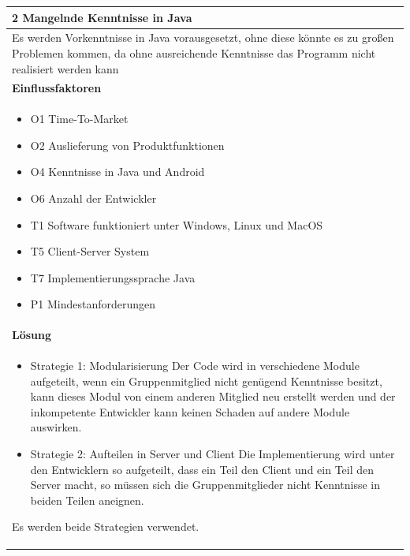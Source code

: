 \documentclass[fontsize=12pt,paper=a4,twoside]{scrartcl}
\begin{document}
\begin{table}[H]
\begin{tabular}{|p{\textwidth}|}\hline
2 Mangelnde Kenntnisse in Java\\ \hline
Es werden Vorkenntnisse in Java vorausgesetzt, ohne diese könnte es zu großen Problemen kommen, da ohne ausreichende Kenntnisse das Programm nicht realisiert werden kann\\ \hline
\textbf{Einflussfaktoren}\\
\begin{itemize}
\item O1 Time-To-Market
\item O2 Auslieferung von Produktfunktionen
\item O4 Kenntnisse in Java und Android
\item O6 Anzahl der Entwickler
\item T1 Software funktioniert unter Windows, Linux und MacOS
\item T5 Client-Server System
\item T7 Implementierungssprache Java
\item P1 Mindestanforderungen
\end{itemize}\\ \hline
\textbf{Lösung}\\
\begin{itemize}
\item Strategie 1: Modularisierung \leavevmode\newline
Der Code wird in verschiedene Module aufgeteilt, wenn ein Gruppenmitglied nicht genügend Kenntnisse besitzt, kann dieses Modul von einem anderen Mitglied neu erstellt werden und der inkompetente Entwickler kann keinen Schaden auf andere Module auswirken.
\item Strategie 2: Aufteilen in Server und Client \leavevmode\newline
Die Implementierung wird unter den Entwicklern so aufgeteilt, dass ein Teil den Client und ein Teil den Server macht, so müssen sich die Gruppenmitglieder nicht Kenntnisse in beiden Teilen aneignen.
\end{itemize}
Es werden beide Strategien verwendet.\\ \hline
\end{tabular}
\end{table}
\end{document}
